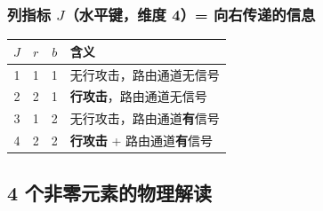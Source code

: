 \documentclass[12pt,a4paper]{article}
\begin{document}
\subsubsection{列指标 $J$（水平键，维度 4）= 向右传递的信息}

\begin{center}
\renewcommand{\arraystretch}{1.2}
\begin{tabular}{c|cc|l}
\toprule
$J$ & $r$ & $b$ & 含义 \\
\midrule
1 & 1 & 1 & 无行攻击，路由通道无信号 \\
2 & 2 & 1 & \textbf{行攻击}，路由通道无信号 \\
3 & 1 & 2 & 无行攻击，路由通道\textbf{有}信号 \\
4 & 2 & 2 & \textbf{行攻击} + 路由通道\textbf{有}信号 \\
\bottomrule
\end{tabular}
\end{center}

\subsection{4 个非零元素的物理解读}
\end{document}

